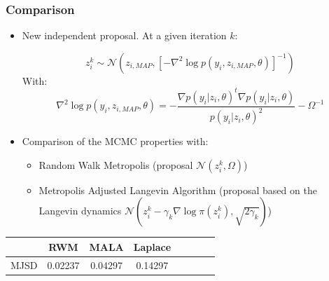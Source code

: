 \documentclass[xcolor={dvipsnames}]{beamer}
\begin{document}
\begin{frame}
\frametitle{Comparison}

\begin{itemize}
\item New independent proposal. At a given iteration $k$:

  \begin{equation}
  z_i^k \sim \mathcal{N}(z_{i,MAP}, [-\nabla^2\log p(y_i,z_{i,MAP},\theta)]^{-1})
  \end{equation}
With:
\begin{equation}
\nabla^2\log p(y_i,z_{i,MAP},\theta) = - \frac{\nabla p(y_i|z_i,\theta)^t \nabla p(y_i|z_i,\theta)}{p(y_i|z_i,\theta)^2} - \Omega^{-1}
\end{equation}
\item Comparison of the MCMC properties with:
\begin{itemize}
  \item Random Walk Metropolis (proposal $\mathcal{N}(z_i^k , \Omega)$)
  \item Metropolis Adjusted Langevin Algorithm (proposal based on the Langevin dynamics $\mathcal{N}(z_i^k - \gamma_k \nabla \log \pi(z_i^k), \sqrt{2\gamma_k})$)
\end{itemize}
\end{itemize}


\begin{center}
\begin{tabular}{SSSSSSSS} \toprule
    {$$} & {RWM} & {MALA} & {Laplace} \\ \midrule
    MJSD  & 0.02237 & 0.04297 & 0.14297  \\ \bottomrule
\end{tabular}
\end{center}

\end{frame}
\end{document}
